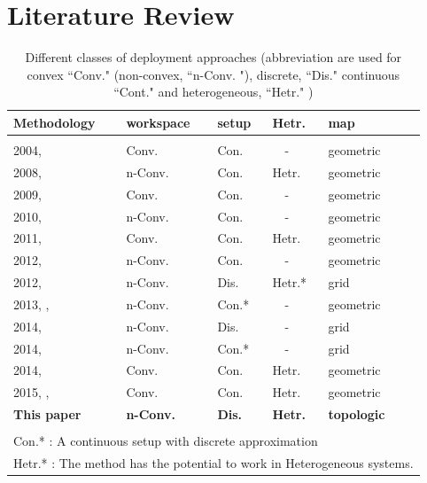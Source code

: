 \documentclass[smallcondensed]{svjour3}
\begin{document}
\section{Literature Review}


\begin{table}[t]
\centering
\caption{Different classes of deployment approaches (abbreviation are used for convex ``Conv." (non-convex, ``n-Conv. "), discrete, ``Dis." continuous ``Cont." and heterogeneous, ``Hetr." )   }
\label{tbl:classification}
\begin{tabular}{m{1.8cm}m{1.2cm}m{0.8cm}m{0.55cm}m{0.55cm}c}
Methodology                  	      & workspace        & setup 	& Hetr. & map    \\
 \hline
 \\
 2004, \cite{Cortes2004}      		 & Conv.     	    & Con.  	&	 ~~- & geometric	\\
 2008, \cite{Pimenta2008}            &n-Conv.           & Con.  	& Hetr.& geometric \\
 2009, \cite{Schwager2009}    		 & Conv.    	    & Con.		&  ~~- & geometric   \\
 2010, \cite{Breitenmoser2010} 		 & n-Conv.	        & Con.   	&  ~~- & geometric	\\
 2011, \cite{Stergi2011}    	     & Conv.  	        & Con. 	 	& Hetr.& geometric \\
 2012, \cite{Mahboubi2012}     		 & n-Conv. 		    & Con. 		&  ~~-   & geometric \\
 2012, \cite{Durham2012}	  		 & n-Conv. 	        & Dis. 		& Hetr.*& grid\\
 2013, \cite{Bhattacharya2013IJRR},\cite{Bhattacharya2013a}	& n-Conv. & Con.*    	&  ~~- 	& geometric\\
 2014, \cite{Yun2013}        		 & n-Conv.		    & Dis. 		&   ~~-  	& grid \\
 2014, \cite{reza2014} 		  		 & n-Conv. 		   & Con.*    &  ~~- 	& grid\\
 2014, \cite{Sharifi2014}  	  		 & Conv. 	  	   & Con.       &  Hetr. 	& geometric\\
 2015, \cite{Sharifi2015},\cite{Pierson2015}  	  	    & Conv. 	   & Con.       &  Hetr. & geometric\\
\textbf{This paper}				  		 &\textbf{n-Conv.}	     & \textbf{Dis.}       &  \textbf{Hetr.} & \textbf{topologic}\\
 \hline
 \\
 \multicolumn{6}{m{8cm}}{ Con.* : A continuous setup with discrete approximation}\\
 \multicolumn{6}{m{8cm}}{ Hetr.* : The method has the potential to work in Heterogeneous systems.}
\end{tabular}
\end{table}
%
\end{document}
